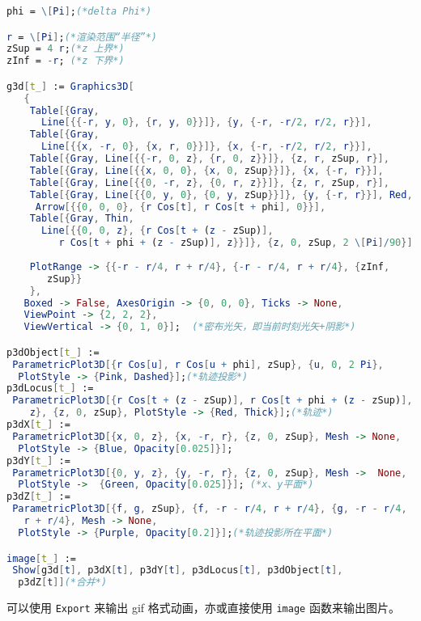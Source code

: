 \begin{lstlisting}[language=Mathematica]
phi = \[Pi];(*delta Phi*)

r = \[Pi];(*渲染范围“半径”*)
zSup = 4 r;(*z 上界*)
zInf = -r; (*z 下界*)

g3d[t_] := Graphics3D[
   {
    Table[{Gray, 
      Line[{{-r, y, 0}, {r, y, 0}}]}, {y, {-r, -r/2, r/2, r}}],
    Table[{Gray, 
      Line[{{x, -r, 0}, {x, r, 0}}]}, {x, {-r, -r/2, r/2, r}}],
    Table[{Gray, Line[{{-r, 0, z}, {r, 0, z}}]}, {z, r, zSup, r}],
    Table[{Gray, Line[{{x, 0, 0}, {x, 0, zSup}}]}, {x, {-r, r}}],
    Table[{Gray, Line[{{0, -r, z}, {0, r, z}}]}, {z, r, zSup, r}],
    Table[{Gray, Line[{{0, y, 0}, {0, y, zSup}}]}, {y, {-r, r}}], Red,
     Arrow[{{0, 0, 0}, {r Cos[t], r Cos[t + phi], 0}}],
    Table[{Gray, Thin, 
      Line[{{0, 0, z}, {r Cos[t + (z - zSup)], 
         r Cos[t + phi + (z - zSup)], z}}]}, {z, 0, zSup, 2 \[Pi]/90}],
    
    PlotRange -> {{-r - r/4, r + r/4}, {-r - r/4, r + r/4}, {zInf, 
       zSup}}
    }, 
   Boxed -> False, AxesOrigin -> {0, 0, 0}, Ticks -> None, 
   ViewPoint -> {2, 2, 2}, 
   ViewVertical -> {0, 1, 0}];  (*密布光矢，即当前时刻光矢+阴影*)

p3dObject[t_] := 
 ParametricPlot3D[{r Cos[u], r Cos[u + phi], zSup}, {u, 0, 2 Pi}, 
  PlotStyle -> {Pink, Dashed}];(*轨迹投影*)
p3dLocus[t_] := 
 ParametricPlot3D[{r Cos[t + (z - zSup)], r Cos[t + phi + (z - zSup)],
    z}, {z, 0, zSup}, PlotStyle -> {Red, Thick}];(*轨迹*)
p3dX[t_] := 
 ParametricPlot3D[{x, 0, z}, {x, -r, r}, {z, 0, zSup}, Mesh -> None, 
  PlotStyle -> {Blue, Opacity[0.025]}];
p3dY[t_] := 
 ParametricPlot3D[{0, y, z}, {y, -r, r}, {z, 0, zSup}, Mesh ->  None, 
  PlotStyle ->  {Green, Opacity[0.025]}]; (*x、y平面*)
p3dZ[t_] := 
 ParametricPlot3D[{f, g, zSup}, {f, -r - r/4, r + r/4}, {g, -r - r/4, 
   r + r/4}, Mesh -> None, 
  PlotStyle -> {Purple, Opacity[0.2]}];(*轨迹投影所在平面*)

image[t_] := 
 Show[g3d[t], p3dX[t], p3dY[t], p3dLocus[t], p3dObject[t], 
  p3dZ[t]](*合并*)
\end{lstlisting}

可以使用 \verb`Export` 来输出 gif 格式动画，亦或直接使用 \verb`image` 函数来输出图片。